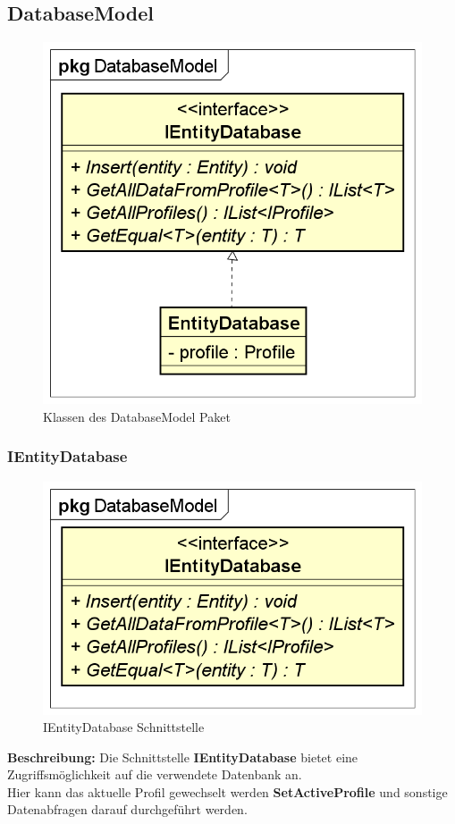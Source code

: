 \documentclass[a4paper]{scrreprt}
\begin{document}
\subsection{DatabaseModel}
\begin{figure}[H]
\centering
\includegraphics[width=0.75\textheight]{graphics/Klassendiagramme/Model/DatabaseModelPackage.png}
\caption{Klassen des DatabaseModel Paket}
\end{figure}

\subsubsection{IEntityDatabase}
\begin{figure}[H]
\centering
\includegraphics[width=0.75\textheight]{graphics/Klassendiagramme/Model/IEntityDatabase.png}
\caption{IEntityDatabase Schnittstelle}
\end{figure}
\textbf{Beschreibung:} Die Schnittstelle \textbf{IEntityDatabase} bietet eine Zugriffsmöglichkeit auf die verwendete Datenbank an.\\
Hier kann das aktuelle Profil gewechselt werden \textbf{SetActiveProfile} und sonstige Datenabfragen darauf durchgeführt werden.
\end{document}
